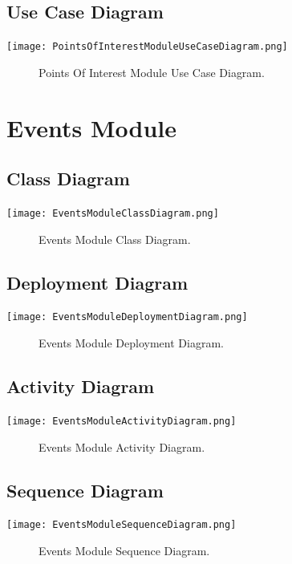 \documentclass[12pt]{article}
\begin{document}
	\subsection{Use Case Diagram}
        	\texttt{[image: PointsOfInterestModuleUseCaseDiagram.png]}
        	\begin{figure}[h]
        		\caption{Points Of Interest Module Use Case Diagram.}
        	\end{figure}
        	
   
   \section{Events Module}
	
	\subsection{Class Diagram}
        \texttt{[image: EventsModuleClassDiagram.png]}
        \begin{figure}[h]
            \caption{Events Module Class Diagram.}
        \end{figure}
    
    \subsection{Deployment Diagram}
        \texttt{[image: EventsModuleDeploymentDiagram.png]}
        \begin{figure}[h]
            \caption{Events Module Deployment Diagram.}
        \end{figure}
        
    \subsection{Activity Diagram}
        \texttt{[image: EventsModuleActivityDiagram.png]}
        \begin{figure}
            \caption{Events Module Activity Diagram.}
        \end{figure}

    \subsection{Sequence Diagram}
        \texttt{[image: EventsModuleSequenceDiagram.png]}
        \begin{figure}[h]
            \caption{Events Module Sequence Diagram.}
        \end{figure}
\end{document}
